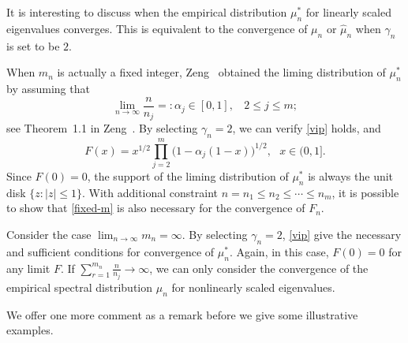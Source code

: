 \documentclass[11pt]{article}
\numberwithin{equation}{section}
\begin{document}
It is interesting to discuss when the empirical distribution
$\mu_n^*$ for linearly scaled eigenvalues converges.  This is
equivalent to the convergence of $\mu_n$ or $\hat\mu_n$ when
$\gamma_n$ is set to be $2$.


When $m_n$ is actually a fixed integer,  Zeng~\cite{Zeng2017}
obtained the liming distribution of $\mu_n^*$ by assuming that
\begin{equation}\label{fixed-m}
\lim_{n\to\infty}\frac{n}{n_j}=:\alpha_j\in [0,1],~~~~2\le j\le m;
 \end{equation}
see Theorem~1.1 in Zeng~\cite{Zeng2017}. By selecting $\gamma_n=2$,
we can verify \eqref{vip} holds, and
\begin{equation}\label{fixed}
    F(x)=x^{1/2}\prod_{j=2}^{m}\big(1-\alpha_j(1-x)\big)^{1/2},~~~x\in (0,1].
\end{equation}
Since $F(0)=0$, the support of the liming distribution of $\mu_n^*$
is always the unit disk $\{z: |z|\le 1\}$.  With additional
constraint $n=n_1\le n_2\le \cdots\le n_m$, it is possible to show
that \eqref{fixed-m} is also necessary for the convergence of $F_n$.


Consider the case $\lim_{n\to\infty}m_n=\infty$. By selecting
$\gamma_n=2$, \eqref{vip} give the necessary and sufficient
conditions for convergence of $\mu_n^*$.  Again, in this case,
$F(0)=0$ for any limit $F$.  If
$\sum^{m_n}_{r=1}\frac{n}{n_j}\to\infty$, we can only consider the
convergence of the empirical spectral distribution $\mu_n$ for
nonlinearly scaled eigenvalues.


We offer one more comment as a remark before we give some
illustrative examples.
\end{document}

